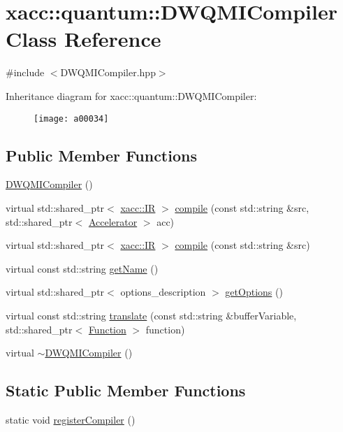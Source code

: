 \hypertarget{a00034}{}\section{xacc\+:\+:quantum\+:\+:D\+W\+Q\+M\+I\+Compiler Class Reference}
\label{a00034}


{\ttfamily \#include $<$D\+W\+Q\+M\+I\+Compiler.\+hpp$>$}

Inheritance diagram for xacc\+:\+:quantum\+:\+:D\+W\+Q\+M\+I\+Compiler\+:\begin{figure}[H]
\begin{center}
\leavevmode
\texttt{[image: a00034]}
\end{center}
\end{figure}
\subsection*{Public Member Functions}
\begin{DoxyCompactItemize}
\item 
\hyperlink{a00034_a1f285f3eaec09363d9439676dbdfbd6a}{D\+W\+Q\+M\+I\+Compiler} ()
\item 
virtual std\+::shared\+\_\+ptr$<$ \hyperlink{a00050}{xacc\+::\+IR} $>$ \hyperlink{a00034_a0df05642f1a6fd44ce7f1c0396d50c9c}{compile} (const std\+::string \&src, std\+::shared\+\_\+ptr$<$ \hyperlink{a00011}{Accelerator} $>$ acc)
\item 
virtual std\+::shared\+\_\+ptr$<$ \hyperlink{a00050}{xacc\+::\+IR} $>$ \hyperlink{a00034_aa22591343b5509bf2c3a5820130ba906}{compile} (const std\+::string \&src)
\item 
virtual const std\+::string \hyperlink{a00034_aed42de96f8e0dd94b6de183f28aee419}{get\+Name} ()
\item 
virtual std\+::shared\+\_\+ptr$<$ options\+\_\+description $>$ \hyperlink{a00034_a0851334cc33b5b1da2694150a0a1a43c}{get\+Options} ()
\item 
virtual const std\+::string \hyperlink{a00034_a56a345539665099329209b3b5f6810c9}{translate} (const std\+::string \&buffer\+Variable, std\+::shared\+\_\+ptr$<$ \hyperlink{a00038}{Function} $>$ function)
\item 
virtual \hyperlink{a00034_a86f9135f7dc1c3246970e2a7f6540b5c}{$\sim$\+D\+W\+Q\+M\+I\+Compiler} ()
\end{DoxyCompactItemize}
\subsection*{Static Public Member Functions}
\begin{DoxyCompactItemize}
\item 
static void \hyperlink{a00034_a421daa5286f31e2b5ab4c141a34c94cd}{register\+Compiler} ()
\end{DoxyCompactItemize}
